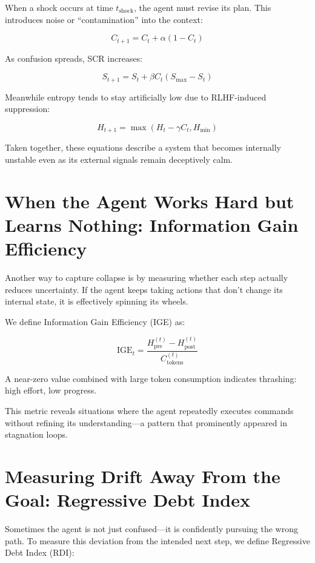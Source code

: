 \documentclass[12pt,a4paper]{report}
\begin{document}
When a shock occurs at time $t_{\text{shock}}$, the agent must revise its plan. This introduces noise or “contamination” into the context:

\begin{equation}
C_{t+1} = C_t + \alpha (1 - C_t)
\end{equation}

As confusion spreads, SCR increases:

\begin{equation}
S_{t+1} = S_t + \beta C_t (S_{\max} - S_t)
\end{equation}

Meanwhile entropy tends to stay artificially low due to RLHF-induced suppression:

\begin{equation}
H_{t+1} = \max(H_t - \gamma C_t, H_{\min})
\end{equation}

Taken together, these equations describe a system that becomes internally unstable even as its external signals remain deceptively calm.

\section{When the Agent Works Hard but Learns Nothing: Information Gain Efficiency}
Another way to capture collapse is by measuring whether each step actually reduces uncertainty. If the agent keeps taking actions that don’t change its internal state, it is effectively spinning its wheels.

We define Information Gain Efficiency (IGE) as:

\begin{equation}
\text{IGE}_t = \frac{H_{\text{pre}}^{(t)} - H_{\text{post}}^{(t)}}{C_{\text{tokens}}^{(t)}}
\end{equation}

A near-zero value combined with large token consumption indicates thrashing: high effort, low progress.

This metric reveals situations where the agent repeatedly executes commands without refining its understanding—a pattern that prominently appeared in stagnation loops.

\section{Measuring Drift Away From the Goal: Regressive Debt Index}
Sometimes the agent is not just confused—it is confidently pursuing the wrong path. To measure this deviation from the intended next step, we define Regressive Debt Index (RDI):
\end{document}
